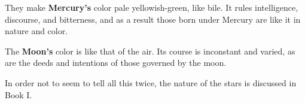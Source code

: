 They make \textbf{Mercury’s} color pale yellowish-green, like bile. It rules intelligence, discourse, and bitterness, and as a result those born under Mercury are like it in nature and color.

The \textbf{Moon’s} color is like that of the air. Its course is inconstant and varied, as are the deeds and intentions of those governed by the moon.

In order not to seem to tell all this twice, the nature of the stars is discussed in Book I.

\newpage